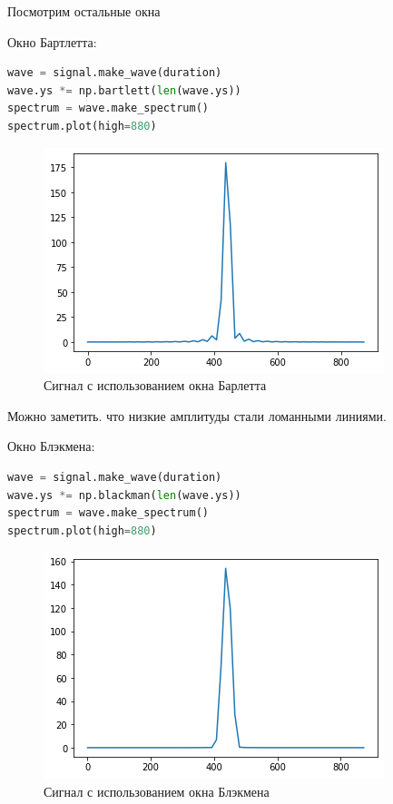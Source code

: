 Посмотрим остальные окна


Окно Бартлетта:
\begin{lstlisting}[language=Python]
wave = signal.make_wave(duration)
wave.ys *= np.bartlett(len(wave.ys))
spectrum = wave.make_spectrum()
spectrum.plot(high=880)
\end{lstlisting}
\begin{figure}[H]
	\begin{center}
		\includegraphics[scale=1]{fig/lab03/lab03_9_0.png}
		\caption{Сигнал с использованием окна Барлетта}
	\end{center}
\end{figure}
Можно заметить. что низкие амплитуды стали ломанными линиями.


Окно Блэкмена:
\begin{lstlisting}[language=Python]
wave = signal.make_wave(duration)
wave.ys *= np.blackman(len(wave.ys))
spectrum = wave.make_spectrum()
spectrum.plot(high=880)
\end{lstlisting}
\begin{figure}[H]
	\begin{center}
		\includegraphics[scale=1]{fig/lab03/lab03_12_0.png}
		\caption{Сигнал с использованием окна Блэкмена}
	\end{center}
\end{figure}

